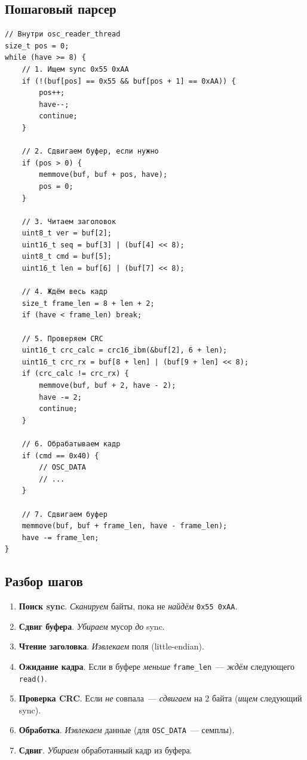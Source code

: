 \subsection{Пошаговый парсер}

\begin{listing}[htbp]
\begin{verbatim}
// Внутри osc_reader_thread
size_t pos = 0;
while (have >= 8) {
    // 1. Ищем sync 0x55 0xAA
    if (!(buf[pos] == 0x55 && buf[pos + 1] == 0xAA)) {
        pos++;
        have--;
        continue;
    }

    // 2. Сдвигаем буфер, если нужно
    if (pos > 0) {
        memmove(buf, buf + pos, have);
        pos = 0;
    }

    // 3. Читаем заголовок
    uint8_t ver = buf[2];
    uint16_t seq = buf[3] | (buf[4] << 8);
    uint8_t cmd = buf[5];
    uint16_t len = buf[6] | (buf[7] << 8);

    // 4. Ждём весь кадр
    size_t frame_len = 8 + len + 2;
    if (have < frame_len) break;

    // 5. Проверяем CRC
    uint16_t crc_calc = crc16_ibm(&buf[2], 6 + len);
    uint16_t crc_rx = buf[8 + len] | (buf[9 + len] << 8);
    if (crc_calc != crc_rx) {
        memmove(buf, buf + 2, have - 2);
        have -= 2;
        continue;
    }

    // 6. Обрабатываем кадр
    if (cmd == 0x40) {
        // OSC_DATA
        // ...
    }

    // 7. Сдвигаем буфер
    memmove(buf, buf + frame_len, have - frame_len);
    have -= frame_len;
}
\end{verbatim}
\caption{Парсер кадра в потоке}
\label{lst:protocol-receive}
\end{listing}

\subsection{Разбор шагов}

\begin{enumerate}
    \item \textbf{Поиск sync}. \emph{Сканируем} байты, пока
          не \emph{найдём} \texttt{0x55 0xAA}.
    \item \textbf{Сдвиг буфера}. \emph{Убираем} мусор \emph{до}
          sync.
    \item \textbf{Чтение заголовка}. \emph{Извлекаем} поля
          (little-endian).
    \item \textbf{Ожидание кадра}. Если в буфере \emph{меньше}
          \texttt{frame\_len}~--- \emph{ждём} следующего
          \texttt{read()}.
    \item \textbf{Проверка CRC}. Если \emph{не} совпала~---
          \emph{сдвигаем} на 2 байта (\emph{ищем} следующий sync).
    \item \textbf{Обработка}. \emph{Извлекаем} данные
          (для \texttt{OSC\_DATA}~--- семплы).
    \item \textbf{Сдвиг}. \emph{Убираем} обработанный кадр
          из буфера.
\end{enumerate}

